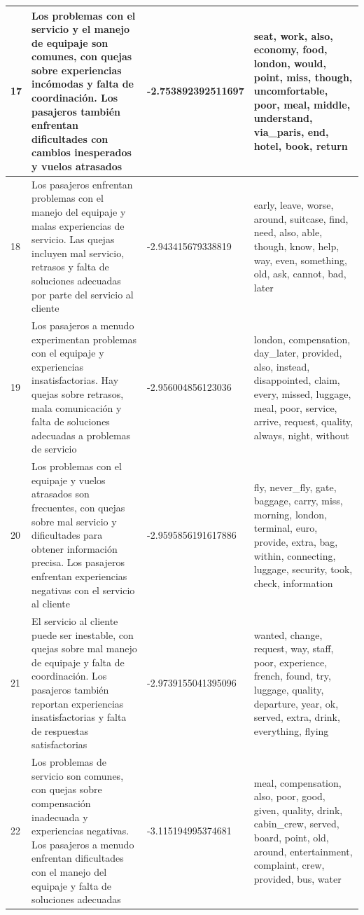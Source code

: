 \documentclass{report}
\begin{document}
{\begin{longtable}{|p{1cm}|p{4cm}|p{4cm}|p{6cm}|}
                    \hline
                    17 & Los problemas con el servicio y el manejo de equipaje son comunes, con quejas sobre experiencias incómodas y falta de coordinación. Los pasajeros también enfrentan dificultades con cambios inesperados y vuelos atrasados & -2.753892392511697 & seat, work, also, economy, food, london, would, point, miss, though, uncomfortable, poor, meal, middle, understand, via\_paris, end, hotel, book, return \\
                    \hline
                    18 & Los pasajeros enfrentan problemas con el manejo del equipaje y malas experiencias de servicio. Las quejas incluyen mal servicio, retrasos y falta de soluciones adecuadas por parte del servicio al cliente & -2.943415679338819 & early, leave, worse, around, suitcase, find, need, also, able, though, know, help, way, even, something, old, ask, cannot, bad, later \\
                    \hline
                    19 & Los pasajeros a menudo experimentan problemas con el equipaje y experiencias insatisfactorias. Hay quejas sobre retrasos, mala comunicación y falta de soluciones adecuadas a problemas de servicio & -2.956004856123036 & london, compensation, day\_later, provided, also, instead, disappointed, claim, every, missed, luggage, meal, poor, service, arrive, request, quality, always, night, without \\
                    \hline
                    20 & Los problemas con el equipaje y vuelos atrasados son frecuentes, con quejas sobre mal servicio y dificultades para obtener información precisa. Los pasajeros enfrentan experiencias negativas con el servicio al cliente & -2.9595856191617886 & fly, never\_fly, gate, baggage, carry, miss, morning, london, terminal, euro, provide, extra, bag, within, connecting, luggage, security, took, check, information \\
                    \hline
                    21 & El servicio al cliente puede ser inestable, con quejas sobre mal manejo de equipaje y falta de coordinación. Los pasajeros también reportan experiencias insatisfactorias y falta de respuestas satisfactorias & -2.9739155041395096 & wanted, change, request, way, staff, poor, experience, french, found, try, luggage, quality, departure, year, ok, served, extra, drink, everything, flying \\
                    \hline
                    22 & Los problemas de servicio son comunes, con quejas sobre compensación inadecuada y experiencias negativas. Los pasajeros a menudo enfrentan dificultades con el manejo del equipaje y falta de soluciones adecuadas & -3.115194995374681 & meal, compensation, also, poor, good, given, quality, drink, cabin\_crew, served, board, point, old, around, entertainment, complaint, crew, provided, bus, water \\

\end{longtable}}
\end{document}
